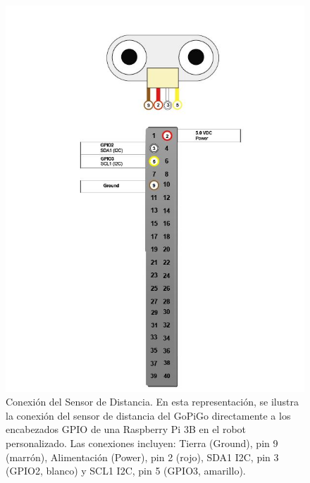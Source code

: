 \begin{figure}[h!]
	\centering\includegraphics[width=\imsize]{sensor_distancia1.png}
	\caption[Conexión del Sensor de Distancia. ]{Conexión del Sensor de Distancia. En esta representación, se ilustra la conexión del sensor de distancia del GoPiGo directamente a los encabezados GPIO de una Raspberry Pi 3B en el robot personalizado. Las conexiones incluyen: Tierra (Ground), pin 9 (marrón), Alimentación (Power), pin 2 (rojo), SDA1 I2C, pin 3 (GPIO2, blanco) y SCL1 I2C, pin 5 (GPIO3, amarillo).}\label{fig:sensor_distancia1}
\end{figure}


